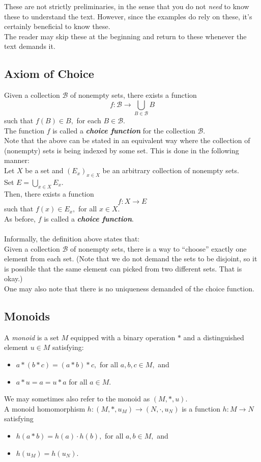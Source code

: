 These are not strictly preliminaries, in the sense that you do not \emph{need} to know these to understand the text. However, since the examples do rely on these, it's certainly beneficial to know these.\\
The reader may skip these at the beginning and return to these whenever the text demands it.
\subsection{Axiom of Choice}
Given a collection $\mathcal{B}$ of nonempty sets, there exists a function
\begin{equation*} 
	f:\mathcal{B} \to \bigcup_{B \in \mathcal{B}}B
\end{equation*}
such that $f(B) \in B,$ for each $B \in \mathcal{B}.$\\
The function $f$ is called a \emph{\textbf{choice function}} for the collection $\mathcal{B}.$\\
Note that the above can be stated in an equivalent way where the collection of (nonempty) sets is being indexed by some set. This is done in the following manner:\\
Let $X$ be a set and $(E_x)_{x \in X}$ be an arbitrary collection of nonempty sets. \\
Set $E = \displaystyle\bigcup_{x \in X}E_x.$ \\
Then, there exists a function
\begin{equation*} 
 	f : X \to E
\end{equation*}
such that $f(x) \in E_x,$ for all $x \in X.$\\
As before, $f$ is called a \emph{\textbf{choice function}}.\\~\\
Informally, the definition above states that:\\
Given a collection $\mathcal{B}$ of nonempty sets, there is a way to ``choose'' exactly one element from each set. (Note that we do not demand the sets to be disjoint, so it is possible that the same element can picked from two different sets. That is okay.) \\
One may also note that there is no uniqueness demanded of the choice function.
\subsection{Monoids}
A \emph{monoid} is a set $M$ equipped with a binary operation $*$ and a distinguished element $u \in M$ satisfying:
\begin{itemize}
	\item $a*(b*c) = (a*b)*c,$ for all $a, b, c \in M,$ and
	\item $a*u = a = u*a$ for all $a \in M.$
\end{itemize}
We may sometimes also refer to the monoid as $(M, *, u).$\\
A monoid homomorphism $h:(M, *, u_M) \to (N, \cdot, u_N)$ is a function $h:M\to N$ satisfying
\begin{itemize}
	\item $h(a*b) = h(a)\cdot h(b),$ for all $a, b \in M,$ and
	\item $h(u_M) = h(u_N).$
\end{itemize}
